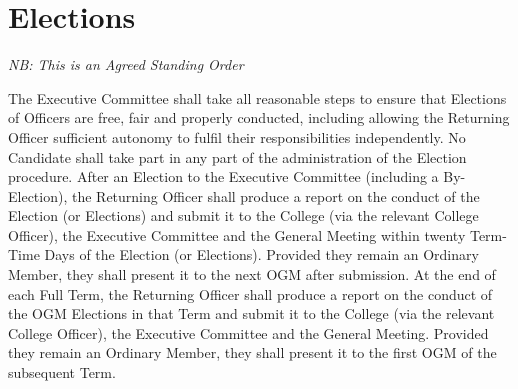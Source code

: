 \chapter{Elections} \label{ch:elections}
\textit{NB: This is an Agreed Standing Order}

\npara The Executive Committee shall take all reasonable steps to ensure that Elections of Officers are free, fair and properly conducted, including allowing the Returning Officer sufficient autonomy to fulfil their responsibilities independently.
\npara No Candidate shall take part in any part of the administration of the Election procedure.
\npara After an Election to the Executive Committee (including a By-Election), the Returning Officer shall produce a report on the conduct of the Election (or Elections) and submit it to the College (via the relevant College Officer), the Executive Committee and the General Meeting within twenty Term-Time Days of the Election (or Elections).  Provided they remain an Ordinary Member, they shall present it to the next OGM after submission.
\npara At the end of each Full Term, the Returning Officer shall produce a report on the conduct of the OGM Elections in that Term and submit it to the College (via the relevant College Officer), the Executive Committee and the General Meeting.  Provided they remain an Ordinary Member, they shall present it to the first OGM of the subsequent Term.
